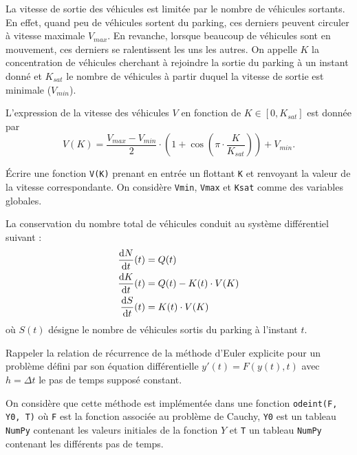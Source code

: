 La vitesse de sortie des véhicules est limitée par le nombre de véhicules sortants. En effet, quand peu de véhicules sortent du parking, ces derniers peuvent circuler à vitesse maximale $V_{max}$. En revanche, lorsque beaucoup de véhicules sont en mouvement, ces derniers se ralentissent les uns les autres. On appelle $K$ la concentration de véhicules cherchant à rejoindre la sortie du parking à un instant donné et $K_{sat}$ le nombre de véhicules à partir duquel la vitesse de sortie est minimale ($V_{min}$).

L'expression de la vitesse des véhicules $V$ en fonction de $K\in[0,K_{sat}]$ est donnée par
\[V(K)=\frac{V_{max}-V_{min}}{2}\cdot\left(1+\cos\left(\pi\cdot\frac{K}{K_{sat}}\right)\right)+V_{min}.\]

\question{} \'Ecrire une fonction \texttt{V(K)} prenant en entrée un flottant \texttt{K} et renvoyant la valeur de la vitesse correspondante. On considère \texttt{Vmin}, \texttt{Vmax} et \texttt{Ksat} comme des variables globales. 


La conservation du nombre total de véhicules conduit au système différentiel suivant :
\begin{align}
\frac{\mathrm{d} N}{\mathrm{d} t}(t)&=Q(t) \label{eq:NbPlusStat}\\
\frac{\mathrm{d} K}{\mathrm{d} t}(t)&= Q(t)-K(t)\cdot V(K)\\\smallskip
\frac{\mathrm{d} S}{\mathrm{d} t}(t)&= K(t)\cdot V(K)\label{eq:Sortis}
\end{align}
où $S(t)$ désigne le nombre de véhicules sortis du parking à l'instant $t$.

\question{} Rappeler la relation de récurrence de la méthode d'Euler explicite pour un problème défini par son équation différentielle $y'(t)=F(y(t), t)$ avec $h=\Delta t$ le pas de temps supposé constant.

On considère que cette méthode est implémentée dans une fonction \texttt{odeint(F, Y0, T)} où \texttt{F} est la fonction associée au problème de Cauchy, \texttt{Y0} est un tableau \texttt{NumPy} contenant les valeurs initiales de la fonction $Y$ et \texttt{T} un tableau \texttt{NumPy} contenant les différents pas de temps.
\medskip

